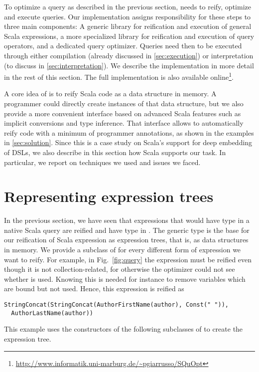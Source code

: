 To optimize a query as described in the previous section, {\LoS} needs to reify, optimize and execute queries.
Our implementation assigns responsibility for these steps to three main components: A generic library for reification and execution of general Scala expressions, a more specialized library for reification and execution of query operators, and a dedicated query optimizer.
Queries need then to be executed through either compilation (already discussed in
\cref{sec:execution}) or interpretation (to discuss in \cref{sec:interpretation}).
We describe the implementation in more detail in the rest of this section. The full implementation is also available online\footnote{\url{http://www.informatik.uni-marburg.de/~pgiarrusso/SQuOpt}}.

A core idea of {\LoS} is to reify Scala code as a data structure in memory. A programmer could directly create instances of that data structure, but we also provide a more convenient interface based on advanced Scala features such as implicit conversions and type inference. That interface allows to automatically reify code with a minimum of programmer annotations, as shown in the examples in \cref{sec:solution}. Since this is a case study on Scala's support for deep embedding of DSLs, we also describe in this section how Scala supports our task. In particular, we report on techniques we used and issues we faced.

\section{Representing expression trees}
\label{subsec:repexptrees}
In the previous section, we have seen that expressions that would have type  in a native Scala query are reified and have type  in \LoS. The generic type  is the base for our reification of Scala expression as expression trees, that is, as data structures in memory. We provide a subclass of  for every different form of expression we want to reify. For example, in Fig.~\ref{fig:query} the expression  must be reified even though it is not collection-related, for otherwise the optimizer could not see whether  is used. Knowing this is needed for instance to remove variables which are bound but not used. Hence, this expression is reified as
\begin{lstlisting}
StringConcat(StringConcat(AuthorFirstName(author), Const(" ")),
  AuthorLastName(author))
\end{lstlisting}
This example uses the constructors of the following subclasses of  to create the expression tree.

